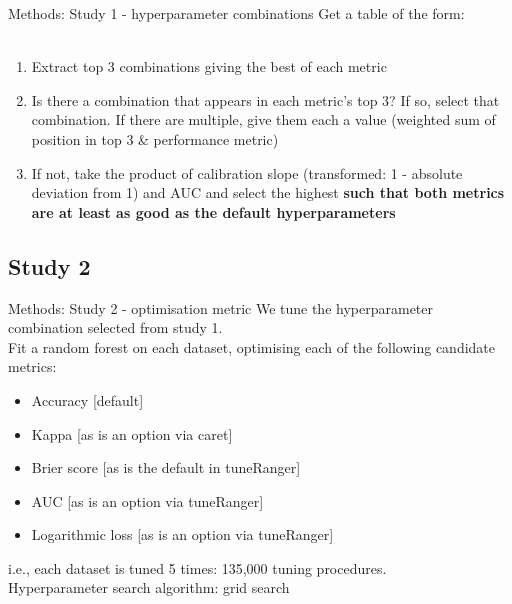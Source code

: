 \documentclass[aspectratio=169]{beamer} %
\begin{document}
\begin{frame}{Methods: Study 1 - hyperparameter combinations}
    Get a table of the form:\\
    \\
    \begin{enumerate}
        \item Extract top 3 combinations giving the best of each metric
            \item Is there a combination that appears in each metric's top 3? If so, select that combination. If there are multiple, give them each a value (weighted sum of position in top 3 \& performance metric)
    \item If not, take the product of calibration slope (transformed: 1 - absolute deviation from 1) and AUC and select the highest \textbf{such that both metrics are at least as good as the default hyperparameters}
    \end{enumerate}
\end{frame}

\subsection{Study 2}

\begin{frame}{Methods: Study 2 - optimisation metric}
    We tune the hyperparameter combination selected from study 1.\\
    Fit a random forest on each dataset, optimising each of the following candidate metrics:\begin{itemize}
        \item Accuracy [default]
        \item Kappa [as is an option via caret]
        \item Brier score [as is the default in tuneRanger]
        \item AUC [as is an option via tuneRanger]
        \item Logarithmic loss [as is an option via tuneRanger]
    \end{itemize}
    i.e., each dataset is tuned 5 times: 135,000 tuning procedures.\\
    Hyperparameter search algorithm: grid search
\end{frame}
\end{document}

